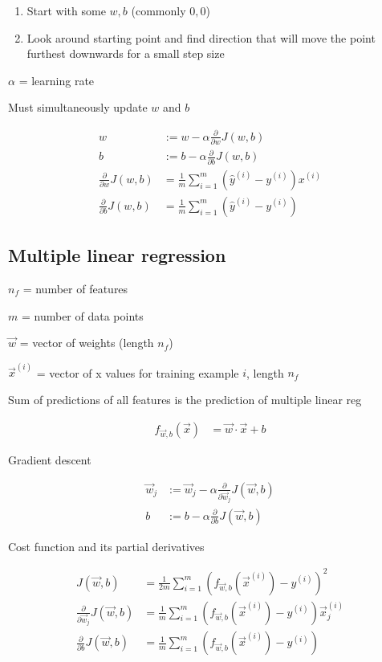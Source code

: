 \documentclass[12pt]{article}
\begin{document}
\begin{enumerate}
	\item Start with some $w,b$ (commonly $0,0$)
	\item Look around starting point and find direction that will move the point furthest downwards for a small step size
\end{enumerate}

$\alpha$ = learning rate

Must simultaneously update $w$ and $b$

\begin{align*}
    w &:= w - \alpha \frac{\partial}{\partial w} J(w,b)\\
    b &:= b - \alpha \frac{\partial}{\partial b} J(w,b)\\
    \frac{\partial}{\partial w} J(w,b) &= \frac{1}{m} \sum_{i=1}^m ({\hat y}^{(i)} - y^{(i)}) x^{(i)}\\
    \frac{\partial}{\partial b} J(w,b) &= \frac{1}{m} \sum_{i=1}^m ({\hat y}^{(i)} - y^{(i)})
\end{align*}

\subsection{Multiple linear regression}

$n_f$ = number of features

$m$ = number of data points

$\vec{w}$ = vector of weights (length $n_f$)

$\vec{x}^{(i)}$ = vector of x values for training example $i$, length $n_f$

Sum of predictions of all features is the prediction of multiple linear reg

\begin{align*}
    f_{\vec{w},b}(\vec{x}) &= \vec{w} \cdot \vec{x} + b
\end{align*}

Gradient descent

\begin{align*}
    \vec{w}_j &:= \vec{w}_j - \alpha \frac{\partial}{\partial \vec{w}_j} J(\vec{w},b)\\
    b &:= b - \alpha \frac{\partial}{\partial b} J(\vec{w},b)
\end{align*}

Cost function and its partial derivatives

\begin{align*}
    J(\vec{w},b) &= \frac{1}{2m} \sum_{i=1}^{m} (f_{\vec{w},b}(\vec{x}^{(i)}) - y^{(i)})^2\\
    \frac{\partial}{\partial \vec{w}_j} J(\vec{w},b) &= \frac{1}{m} \sum_{i=1}^{m} (f_{\vec{w},b}(\vec{x}^{(i)}) - y^{(i)}) \vec{x}^{(i)}_j\\
    \frac{\partial}{\partial b} J(\vec{w},b) &= \frac{1}{m} \sum_{i=1}^{m} (f_{\vec{w},b}(\vec x^{(i)}) - y^{(i)})
\end{align*}
\end{document}
